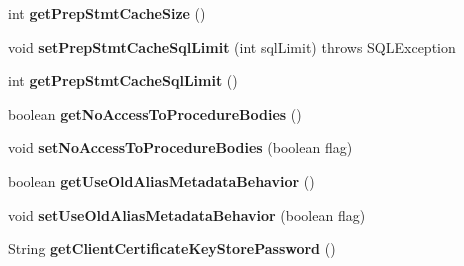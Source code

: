 \begin{DoxyCompactItemize}
\item 
\mbox{\label{interfacecom_1_1mysql_1_1jdbc_1_1_connection_properties_aefb3e2fb263132130867342b29df9fbe}} 
int {\bfseries get\+Prep\+Stmt\+Cache\+Size} ()
\item 
\mbox{\label{interfacecom_1_1mysql_1_1jdbc_1_1_connection_properties_a66fab74c5bb9a58713b16986ba8d96c1}} 
void {\bfseries set\+Prep\+Stmt\+Cache\+Sql\+Limit} (int sql\+Limit)  throws S\+Q\+L\+Exception
\item 
\mbox{\label{interfacecom_1_1mysql_1_1jdbc_1_1_connection_properties_a738c6831cfc29bc81696c4605b1b6632}} 
int {\bfseries get\+Prep\+Stmt\+Cache\+Sql\+Limit} ()
\item 
\mbox{\label{interfacecom_1_1mysql_1_1jdbc_1_1_connection_properties_aba42a6b7cccd24624f3a42fb4c421ddf}} 
boolean {\bfseries get\+No\+Access\+To\+Procedure\+Bodies} ()
\item 
\mbox{\label{interfacecom_1_1mysql_1_1jdbc_1_1_connection_properties_ae1f6b99c2c781f168daadafde1baec62}} 
void {\bfseries set\+No\+Access\+To\+Procedure\+Bodies} (boolean flag)
\item 
\mbox{\label{interfacecom_1_1mysql_1_1jdbc_1_1_connection_properties_a8e741ae911e1abcbb948b2f7ec57c3e8}} 
boolean {\bfseries get\+Use\+Old\+Alias\+Metadata\+Behavior} ()
\item 
\mbox{\label{interfacecom_1_1mysql_1_1jdbc_1_1_connection_properties_a8f1da9f4cc4ac6ac9ed61ed0d55120c1}} 
void {\bfseries set\+Use\+Old\+Alias\+Metadata\+Behavior} (boolean flag)
\item 
\mbox{\label{interfacecom_1_1mysql_1_1jdbc_1_1_connection_properties_a67fb3cf11bf5a77587b84e69c2ad03da}} 
String {\bfseries get\+Client\+Certificate\+Key\+Store\+Password} ()
\item 

\end{DoxyCompactItemize}
